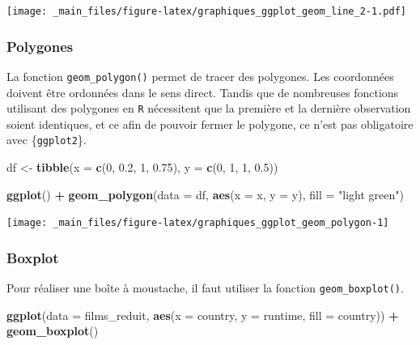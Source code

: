 \documentclass[
  11pt,
]{book}
\newenvironment{Shaded}{\begin{snugshade}}{\end{snugshade}}
\newcommand{\DataTypeTok}[1]{\textcolor[rgb]{0.13,0.29,0.53}{#1}}
\newcommand{\DecValTok}[1]{\textcolor[rgb]{0.00,0.00,0.81}{#1}}
\newcommand{\FloatTok}[1]{\textcolor[rgb]{0.00,0.00,0.81}{#1}}
\newcommand{\KeywordTok}[1]{\textcolor[rgb]{0.13,0.29,0.53}{\textbf{#1}}}
\newcommand{\NormalTok}[1]{#1}
\newcommand{\OperatorTok}[1]{\textcolor[rgb]{0.81,0.36,0.00}{\textbf{#1}}}
\newcommand{\StringTok}[1]{\textcolor[rgb]{0.31,0.60,0.02}{#1}}
\numberwithin{equation}{section}
\numberwithin{countremarque}{section}
\begin{document}
\texttt{[image: \_main\_files/figure-latex/graphiques\_ggplot\_geom\_line\_2-1.pdf]}

\hypertarget{graphiques_ggplot_geom_polygon}{%
\subsubsection{Polygones}\label{graphiques_ggplot_geom_polygon}}

La fonction \texttt{geom\_polygon()} permet de tracer des polygones. Les coordonnées doivent être ordonnées dans le sens direct. Tandis que de nombreuses fonctions utilisant des polygones en \texttt{R} nécessitent que la première et la dernière observation soient identiques, et ce afin de pouvoir fermer le polygone, ce n'est pas obligatoire avec \{\texttt{ggplot2}\}.

\begin{Shaded}
\begin{Highlighting}[]
\NormalTok{df \textless{}{-}}\StringTok{ }\KeywordTok{tibble}\NormalTok{(}\DataTypeTok{x =} \KeywordTok{c}\NormalTok{(}\DecValTok{0}\NormalTok{, }\FloatTok{0.2}\NormalTok{, }\DecValTok{1}\NormalTok{, }\FloatTok{0.75}\NormalTok{), }\DataTypeTok{y =} \KeywordTok{c}\NormalTok{(}\DecValTok{0}\NormalTok{, }\DecValTok{1}\NormalTok{, }\DecValTok{1}\NormalTok{, }\FloatTok{0.5}\NormalTok{))}

\KeywordTok{ggplot}\NormalTok{() }\OperatorTok{+}\StringTok{ }
\StringTok{  }\KeywordTok{geom\_polygon}\NormalTok{(}\DataTypeTok{data =}\NormalTok{ df, }\KeywordTok{aes}\NormalTok{(}\DataTypeTok{x =}\NormalTok{ x, }\DataTypeTok{y =}\NormalTok{ y), }\DataTypeTok{fill =} \StringTok{"light green"}\NormalTok{)}
\end{Highlighting}
\end{Shaded}

\begin{center}\texttt{[image: \_main\_files/figure-latex/graphiques\_ggplot\_geom\_polygon-1]} \end{center}

\hypertarget{graphiques_ggplot_geom_boxplot}{%
\subsubsection{Boxplot}\label{graphiques_ggplot_geom_boxplot}}

Pour réaliser une boîte à moustache, il faut utiliser la fonction \texttt{geom\_boxplot()}.

\begin{Shaded}
\begin{Highlighting}[]
\KeywordTok{ggplot}\NormalTok{(}\DataTypeTok{data =}\NormalTok{ films\_reduit,}
       \KeywordTok{aes}\NormalTok{(}\DataTypeTok{x =}\NormalTok{ country, }\DataTypeTok{y =}\NormalTok{ runtime, }\DataTypeTok{fill =}\NormalTok{ country)) }\OperatorTok{+}
\StringTok{  }\KeywordTok{geom\_boxplot}\NormalTok{()}
\end{Highlighting}
\end{Shaded}
\end{document}
